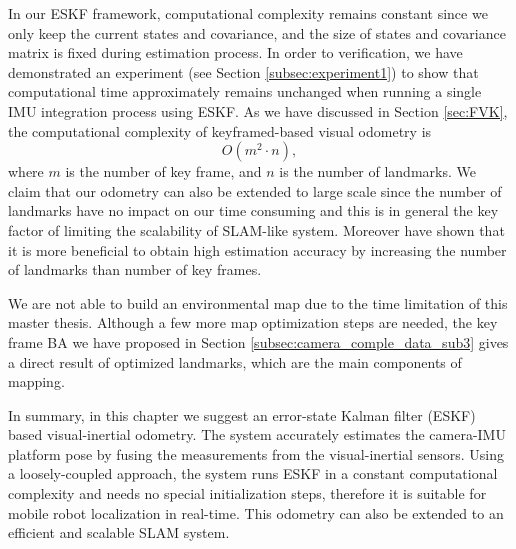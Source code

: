 In our ESKF framework, computational complexity remains constant since we only keep the current states and covariance, and the size of states and covariance matrix is fixed during estimation process. In order to verification, we have demonstrated an experiment (see Section \ref{subsec:experiment1}) to show that computational time approximately remains unchanged when running a single IMU integration process using ESKF. As we have discussed in Section \ref{sec:FVK}, the computational complexity of keyframed-based visual odometry is 
\begin{equation}
	O(m^2 \cdot n),
\end{equation}
where $m$ is the number of key frame, and $n$ is the number of landmarks. We claim that our odometry can also be extended to large scale since the number of landmarks have no impact on our time consuming and this is in general the key factor of limiting the scalability of SLAM-like system. Moreover \cite{strasdat2010real} have shown that it is more beneficial to obtain high estimation accuracy by increasing the number of landmarks than number of key frames.

We are not able to build an environmental map due to the time limitation of this master thesis. Although a few more map optimization steps are needed, the key frame BA we have proposed in Section \ref{subsec:camera_comple_data_sub3} gives a direct result of optimized landmarks, which are the main components of mapping.

In summary, in this chapter we suggest an error-state Kalman filter (ESKF) based visual-inertial odometry. The system accurately estimates the camera-IMU platform pose by fusing the measurements from the visual-inertial sensors. Using a loosely-coupled approach, the system runs ESKF in a constant computational complexity and needs no special initialization steps, therefore it is suitable for mobile robot localization in real-time. This odometry can also be extended to an efficient and scalable SLAM system.

